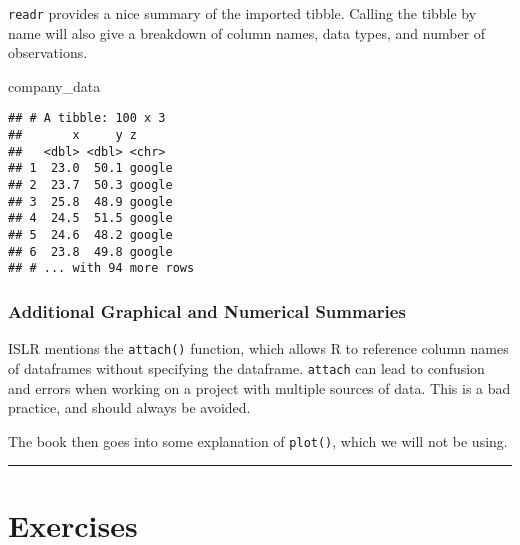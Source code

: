 \documentclass[]{book}
\newenvironment{Shaded}{\begin{snugshade}}{\end{snugshade}}
\newcommand{\NormalTok}[1]{#1}
\begin{document}
\texttt{readr} provides a nice summary of the imported tibble. Calling the tibble by name will also give a breakdown of column names, data types, and number of observations.

\begin{Shaded}
\begin{Highlighting}[]
\NormalTok{company_data}
\end{Highlighting}
\end{Shaded}

\begin{verbatim}
## # A tibble: 100 x 3
##       x     y z     
##   <dbl> <dbl> <chr> 
## 1  23.0  50.1 google
## 2  23.7  50.3 google
## 3  25.8  48.9 google
## 4  24.5  51.5 google
## 5  24.6  48.2 google
## 6  23.8  49.8 google
## # ... with 94 more rows
\end{verbatim}

\hypertarget{additional-graphical-and-numerical-summaries}{%
\subsubsection{Additional Graphical and Numerical Summaries}\label{additional-graphical-and-numerical-summaries}}

ISLR mentions the \texttt{attach()} function, which allows R to reference column names of dataframes without specifying the dataframe. \texttt{attach} can lead to confusion and errors when working on a project with multiple sources of data. This is a bad practice, and should always be avoided.

The book then goes into some explanation of \texttt{plot()}, which we will not be using.

\begin{center}\rule{0.5\linewidth}{\linethickness}\end{center}

\hypertarget{exercises}{%
\section{Exercises}\label{exercises}}
\end{document}
